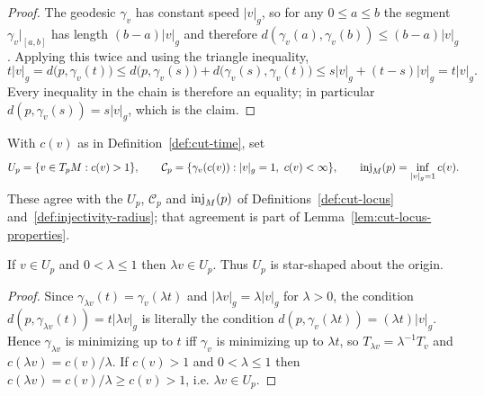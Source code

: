 \begin{proof}
\sketch
{}

The geodesic $\gamma_v$ has constant speed $\lvert v\rvert_g$, so for any $0\le a\le b$ the
segment $\gamma_v|_{[a,b]}$ has length $(b-a)\lvert v\rvert_g$ and therefore
$d(\gamma_v(a),\gamma_v(b))\le (b-a)\lvert v\rvert_g$. Applying this twice and using the
triangle inequality,
$$t\lvert v\rvert_g=d\bigl(p,\gamma_v(t)\bigr)
\le d\bigl(p,\gamma_v(s)\bigr)+d\bigl(\gamma_v(s),\gamma_v(t)\bigr)
\le s\lvert v\rvert_g+(t-s)\lvert v\rvert_g=t\lvert v\rvert_g .$$
Every inequality in the chain is therefore an equality; in particular
$d(p,\gamma_v(s))=s\lvert v\rvert_g$, which is the claim.
\end{proof}

\begin{definition}
\label{def:cut-time-locus}





With $c(v)$ as in Definition~\ref{def:cut-time}, set
$$U_p=\{v\in T_pM : c(v)>1\},\qquad
{\mathcal C}_p=\{\gamma_v(c(v)) : \lvert v\rvert_g=1,\ c(v)<\infty\},\qquad
\inj_M(p)=\inf_{\lvert v\rvert_g=1} c(v).$$
These agree with the $U_p$, ${\mathcal C}_p$ and $\operatorname{inj}_M(p)$ of
Definitions~\ref{def:cut-locus} and~\ref{def:injectivity-radius}; that agreement is part of
Lemma~\ref{lem:cut-locus-properties}.
\end{definition}

\begin{lemma}
\label{lem:segment-domain-star-shaped}





If $v\in U_p$ and $0<\lambda\le1$ then $\lambda v\in U_p$. Thus $U_p$ is star-shaped about
the origin.
\end{lemma}

\begin{proof}
\sketch
{}

Since $\gamma_{\lambda v}(t)=\gamma_v(\lambda t)$ and
$\lvert \lambda v\rvert_g=\lambda\lvert v\rvert_g$ for $\lambda>0$, the condition
$d(p,\gamma_{\lambda v}(t))=t\lvert\lambda v\rvert_g$ is literally the condition
$d(p,\gamma_v(\lambda t))=(\lambda t)\lvert v\rvert_g$. Hence $\gamma_{\lambda v}$ is
minimizing up to $t$ iff $\gamma_v$ is minimizing up to $\lambda t$, so
$T_{\lambda v}=\lambda^{-1}T_v$ and $c(\lambda v)=c(v)/\lambda$. If $c(v)>1$ and
$0<\lambda\le 1$ then $c(\lambda v)=c(v)/\lambda\ge c(v)>1$, i.e. $\lambda v\in U_p$.
\end{proof}

